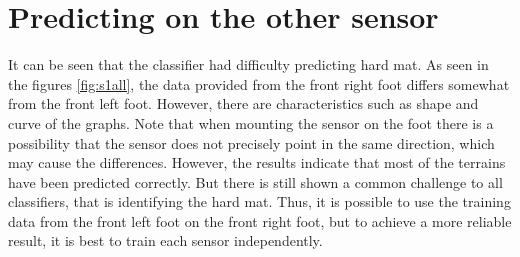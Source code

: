 \documentclass[USenglish]{ifimaster}  %
\begin{document}
\section{Predicting on the other sensor}
It can be seen that the classifier had difficulty predicting hard mat. As seen in the figures \ref{fig:s1all}, the data provided from the front right foot differs somewhat from the front left foot. However, there are characteristics such as shape and curve of the graphs. Note that when mounting the sensor on the foot there is a possibility that the sensor does not precisely point in the same direction, which may cause the differences. However, the results indicate that most of the terrains have been predicted correctly. But there is still shown a common challenge to all classifiers, that is identifying the hard mat. Thus, it is possible to use the training data from the front left foot on the front right foot, but to achieve a more reliable result, it is best to train each sensor independently.
	
\end{document}
